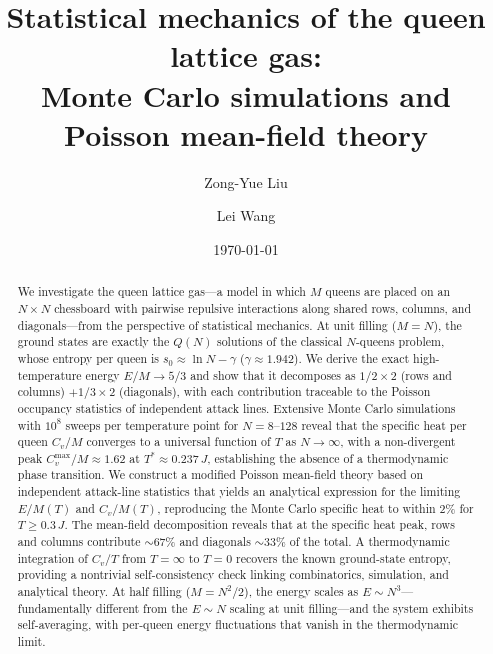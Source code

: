 \documentclass[aps, pre, reprint, amsmath, amssymb, superscriptaddress, floatfix]{revtex4-2}
\begin{document}
\title{Statistical mechanics of the queen lattice gas:\\
Monte Carlo simulations and Poisson mean-field theory}

\author{Zong-Yue Liu}

\author{Lei Wang}

\date{\today}

\begin{abstract}
We investigate the queen lattice gas---a model in which $M$ queens
are placed on an $N \times N$ chessboard with pairwise repulsive
interactions along shared rows, columns, and diagonals---from the
perspective of statistical mechanics.  At unit filling ($M = N$), the
ground states are exactly the $Q(N)$ solutions of the classical
$N$-queens problem, whose entropy per queen is
$s_0 \approx \ln N - \gamma$ ($\gamma \approx 1.942$).
We derive the exact high-temperature energy $E/M \to 5/3$ and show
that it decomposes as $1/2 \times 2$ (rows and columns)
$+ 1/3 \times 2$ (diagonals), with each contribution traceable to
the Poisson occupancy statistics of independent attack lines.
Extensive Monte Carlo simulations with $10^8$ sweeps per temperature
point for $N = 8$--$128$ reveal that the specific heat per queen
$C_v/M$ converges to a universal function of $T$ as $N \to \infty$,
with a non-divergent peak $C_v^{\max}/M \approx 1.62$ at
$T^* \approx 0.237\,J$, establishing the absence of a thermodynamic
phase transition.  We construct a modified Poisson mean-field theory
based on independent attack-line statistics that yields an analytical
expression for the limiting $E/M(T)$ and $C_v/M(T)$, reproducing
the Monte Carlo specific heat to within $2\%$ for $T \ge 0.3\,J$.
The mean-field decomposition reveals that at the specific heat peak,
rows and columns contribute $\sim 67\%$ and diagonals $\sim 33\%$ of
the total.
A thermodynamic integration of $C_v/T$ from $T = \infty$ to $T = 0$
recovers the known ground-state entropy, providing a nontrivial
self-consistency check linking combinatorics, simulation, and
analytical theory.  At half filling ($M = N^2/2$), the energy scales as
$E \sim N^3$---fundamentally different from the $E \sim N$
scaling at unit filling---and the system exhibits self-averaging,
with per-queen energy fluctuations that vanish in the
thermodynamic limit.
\end{abstract}

\maketitle
\end{document}
